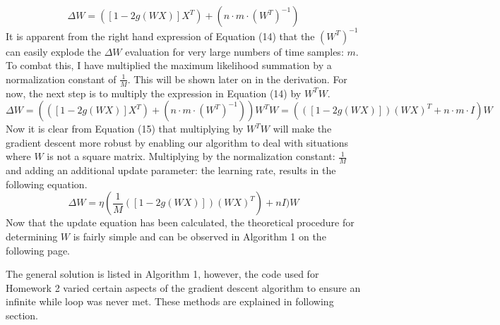 \documentclass[12pt]{article}
\begin{document}
\begin{equation}
    \Delta W = ([1-2g(WX)]X^{T})+(n\cdot m\cdot(W^{T})^{-1})
\end{equation}
\bigbreak
\noindent
It is apparent from the right hand expression of Equation (14) that the \((W^{T})^{-1}\) can easily explode the \(\Delta W\) evaluation for very large numbers of time samples: \(m\). To combat this, I have multiplied the maximum likelihood summation by a normalization constant of \(\frac{1}{M}\). This will be shown later on in the derivation. For now, the next step is to multiply the expression in Equation (14) by \(W^{T}W\). 
\begin{equation}
    \Delta W = (([1-2g(WX)]X^{T})+(n\cdot m\cdot(W^{T})^{-1}))W^{T}W = (([1-2g(WX)])(WX)^{T}+n\cdot m\cdot I)W
\end{equation}
Now it is clear from Equation (15) that multiplying by \(W^{T}W\) will make the gradient descent more robust by enabling our algorithm to deal with situations where \(W\) is not a square matrix.
\bigbreak
\noindent
Multiplying by the normalization constant: \(\frac{1}{M}\) and adding an additional update parameter: the learning rate, results in the following equation.
\begin{equation}
    \Delta W = \eta (\frac{1}{M}([1-2g(WX)])(WX)^{T})+nI)W
\end{equation}
\bigbreak
\noindent
Now that the update equation has been calculated, the theoretical procedure for determining \(W\) is fairly simple and can be observed in Algorithm 1 on the following page.
\bigbreak
\begin{algorithm}[H]
    \SetAlgoLined
    \DontPrintSemicolon
     $\var{W}$ \supset  $\var{w}_{i,j}$
     
     ${w_{i,j}$ \in \mathbb{R} : { 0\leq $\var{w}_{i,j}$ \leq5 }
     
     $\eta = 0.01 $
     
     $isConverged = False$
     
     \While{not isConverged}{
      $Y=WX$
      
      $Z=\frac{1}{1+e^{-y_{i,j}}}$
      
      $\Delta W=\eta (I+\frac{1}{M}(1-2Z)(WX)^{T})W$
      
      $W=W+\Delta W$ 
      
      \If{\left \| \Delta W \right \| < 0.0001}{
       $isConverged = True$
       }
 }
 \caption{Gradient Descent for Determining Reconstruction Matrix: W}
\end{algorithm}
\bigbreak
\noindent
The general solution is listed in Algorithm 1, however, the code used for Homework 2 varied certain aspects of the gradient descent algorithm to ensure an infinite while loop was never met. These methods are explained in following section.
\end{document}
